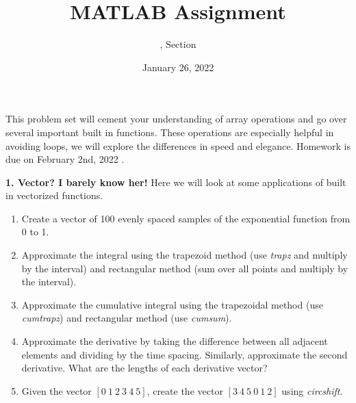 \documentclass[11pt]{article}
\title{MATLAB Assignment \Homework}
\author{\Session, Section \Section}
\date{January 26, 2022}
\def\DateOfSubmission{February 2nd, 2022 }
\newenvironment{qparts}{\begin{enumerate}[{(}a{)}]}{\end{enumerate}}
\begin{document}
\maketitle
This problem set will cement your understanding of array operations and go over several important built in functions.  These operations are especially helpful in avoiding loops, we will explore the differences in speed and elegance. Homework is due on \DateOfSubmission. 

 \noindent \textbf{1. Vector? I barely know her!} Here we will look at some applications of built in vectorized functions.
 \begin{qparts}
  \item Create a vector of 100 evenly spaced samples of the exponential function from 0 to 1.
  \item Approximate the integral using the trapezoid method (use \emph{trapz} and multiply by the interval) and rectangular method (sum over all points and multiply by the interval).
  \item Approximate the cumulative integral using the trapezoidal method (use \emph{cumtrapz}) and rectangular method (use \emph{cumsum}).

  \item Approximate the derivative by taking the difference between all adjacent elements and dividing by the time spacing. Similarly, approximate the second derivative.  What are the lengths of each derivative vector?
  \item Given the vector $[0\ 1\ 2\ 3\ 4\ 5]$, create the vector $[3\ 4\ 5\ 0\ 1\ 2]$ using \emph{circshift}.
 \end{qparts}
\end{document}
